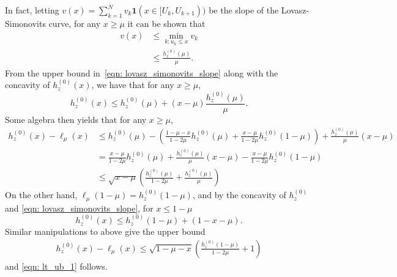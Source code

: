 \documentclass[11pt,twoside]{article}
\newcommand{\1}{\mathbf{1}}
\begin{document}
In fact, letting $v(x) = \sum_{k = 1}^{N} v_k \1(x \in [U_k, U_{k+1}) )$ be the slope of the Lovasz-Simonovits curve, for any $x \geq \mu$ it can be shown that
\begin{align}
v(x) & \leq \min_{k: u_k \leq x} v_k \nonumber  \\
& \leq \frac{h_z^{(0)}(\mu)}{\mu}. \label{eqn: lovasz_simonovits_slope}
\end{align}
From the upper bound in~\eqref{eqn: lovasz_simonovits_slope} along with the concavity of $h_z^{(0)}(x)$, we have that for any $x \geq \mu$,
\begin{equation*}
h_z^{(0)}(x) \leq h_z^{(0)}(\mu) + (x - \mu)\frac{h_z^{(0)}(\mu)}{\mu}.
\end{equation*}
Some algebra then yields that for any $x \geq \mu$,
\begin{align*}
h_z^{(0)}(x) - \ell_{\mu}(x) & \leq h_z^{(0)}(\mu) - \left(\frac{1 - \mu - x}{1 - 2\mu} h_z^{(0)}(\mu) + \frac{x - \mu}{1 - 2\mu} h_z^{(0)}(1 - \mu)\right) + \frac{h_z^{(0)}(\mu)}{\mu}(x - \mu) \\
& =  \frac{x - \mu}{1 - 2\mu}h_z^{(0)}(\mu) + \frac{h_z^{(0)}(\mu)}{\mu} (x - \mu) - \frac{x - \mu}{1 - 2\mu} h_z^{(0)}(1 - \mu) \\
& \leq \sqrt{x - \mu} \left(\frac{h_z^{(0)}(\mu)}{1 - 2\mu} + \frac{h_z^{(0)}(\mu)}{\mu} \right)
\end{align*}
On the other hand, $\ell_{\mu}(1 - \mu) = h_z^{(0)}(1 - \mu)$, and by the concavity of $h_z^{(0)}$ and \eqref{eqn: lovasz_simonovits_slope},  for $x \leq 1 - \mu$
\begin{equation*}
h_z^{(0)}(x) \leq h_z^{(0)}(1 - \mu) + (1 - x - \mu).
\end{equation*}
Similar manipulations to above give the upper bound
\begin{align*}
h_z^{(0)}(x) - \ell_{\mu}(x) \leq \sqrt{1 - \mu - x}\left(\frac{h_z^{(0)}(1 - \mu) }{1 - 2\mu} + 1\right)
\end{align*}
and \eqref{eqn: lt_ub_1} follows.
\end{document}
